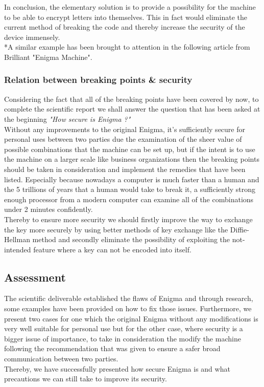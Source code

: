 \documentclass[conference,compsoc]{IEEEtran}
\begin{document}
In conclusion, the elementary solution is to provide a possibility for the machine to be able to encrypt letters into themselves. This in fact would eliminate the current method of breaking the code and thereby increase the security of the device immensely.\\

*A similar example has been brought to attention in the following article from Brilliant "Enigma Machine".

\subsubsection{Relation between breaking points \& security} Considering the fact that all of the breaking points have been covered by now, to complete the scientific report we shall answer the question that has been asked at the beginning \emph{"How secure is Enigma ?"}\\

Without any improvements to the original Enigma, it's sufficiently secure for personal uses between two parties due the examination of the sheer value of possible combinations that the machine can be set up, but if the intent is to use the machine on a larger scale like business organizations then the breaking points should be taken in consideration and implement the remedies that have been listed. Especially because nowadays a computer is much faster than a human and the 5 trillions of years that a human would take to break it, a sufficiently strong enough processor from a modern computer can examine all of the combinations under 2 minutes confidently.\\
Thereby to ensure more security we should firstly improve the way to exchange the key more securely by using better methods of key exchange like the Diffie-Hellman method and secondly eliminate the possibility of exploiting the not-intended feature where a key can not be encoded into itself.\\




\subsection{Assessment}
The scientific deliverable established the flaws of Enigma and through research, some examples have been provided on how to fix those issues. Furthermore, we present two cases for one which the original Enigma without any modifications is very well suitable for personal use but for the other case, where security is a bigger issue of importance, to take in consideration the modify the machine following the recommendation that was given to ensure a safer broad communication between two parties.\\
Thereby, we have successfully presented how secure Enigma is and what precautions we can still take to improve its security.\\
\end{document}
